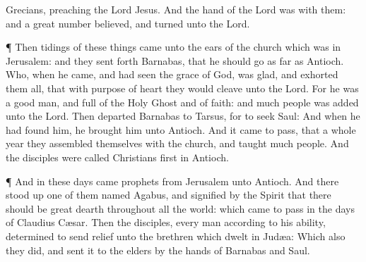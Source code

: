 {Grecians,
preaching the
Lord
Jesus.
And the
hand of the
Lord
was
with
them:
and a
great
number
believed, and
turned
unto the
Lord.
\par }{\PP {}¶
Then
tidings
of these
things
came
unto the
ears of the
church which
was
in
Jerusalem:
and they sent
forth
Barnabas, that he should
go as far
as
Antioch.
Who, when he
came,
and had
seen the
grace of
God, was
glad,
and
exhorted them
all, that with
purpose of
heart they would
cleave unto the
Lord.
For he
was a
good
man,
and
full of the
Holy
Ghost
and of
faith:
and
much
people was
added unto the
Lord.
Then
departed
Barnabas
to
Tarsus, for to
seek
Saul:
And when he had
found
him, he
brought
him
unto
Antioch.
And it came to pass,
that a
whole
year they
assembled
themselves
with the
church,
and
taught
much
people.
And the
disciples were
called
Christians
first
in
Antioch.
\par }{\PP {}¶
And
in
these
days
came
prophets
from
Jerusalem
unto
Antioch.
And there stood
up
one
of
them
named
Agabus, and
signified
by the
Spirit that there
should
be
great
dearth
throughout
all the
world:
which came to
pass
in the days of
Claudius
Cæsar.
Then the
disciples,
every
man according
to
his
ability,
determined to
send
relief
unto the
brethren
which
dwelt
in
Judæa:
Which
also they
did, and sent
it
to the
elders
by the
hands of
Barnabas
and
Saul.

}
